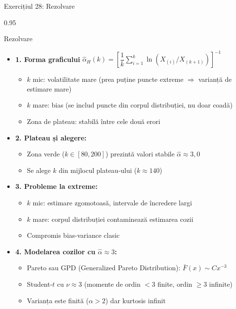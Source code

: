 \documentclass[9pt, aspectratio=169, t]{beamer}
\begin{document}
\begin{frame}[shrink=25]{Exercițiul 28: Rezolvare}
\begin{cminipage}{0.95\textwidth}
\begin{exampleblock}{Rezolvare}
\begin{itemize}\setlength{\itemsep}{0pt}
    \item \textbf{1. Forma graficului} \quad $\hat\alpha_H(k) = \left[\dfrac{1}{k}\sum_{i=1}^{k} \ln(X_{(i)}/X_{(k+1)})\right]^{-1}$
    \begin{itemize}\setlength{\itemsep}{0pt}
        \item $k$ mic: volatilitate mare (prea puține puncte extreme $\Rightarrow$ varianță de estimare mare)
        \item $k$ mare: bias (se includ puncte din corpul distribuției, nu doar coadă)
        \item Zona de plateau: stabilă între cele două erori
    \end{itemize}
    \item \textbf{2. Plateau și alegere:}
    \begin{itemize}\setlength{\itemsep}{0pt}
        \item Zona verde ($k \in [80, 200]$) prezintă valori stabile $\hat\alpha \approx 3{,}0$
        \item Se alege $k$ din mijlocul plateau-ului ($k \approx 140$)
    \end{itemize}
    \item \textbf{3. Probleme la extreme:}
    \begin{itemize}\setlength{\itemsep}{0pt}
        \item $k$ mic: estimare zgomotoasă, intervale de încredere largi
        \item $k$ mare: corpul distribuției contaminează estimarea cozii
        \item Compromis bias-variance clasic
    \end{itemize}
    \item \textbf{4. Modelarea cozilor cu $\hat\alpha \approx 3$:}
    \begin{itemize}\setlength{\itemsep}{0pt}
        \item Pareto sau GPD (Generalized Pareto Distribution): $\bar F(x) \sim C x^{-3}$
        \item Student-$t$ cu $\nu \approx 3$ (momente de ordin $< 3$ finite, ordin $\ge 3$ infinite)
        \item Varianța este finită ($\alpha > 2$) dar kurtosis infinit
    \end{itemize}
\end{itemize}
\end{exampleblock}
\end{cminipage}
\end{frame}
\end{document}
